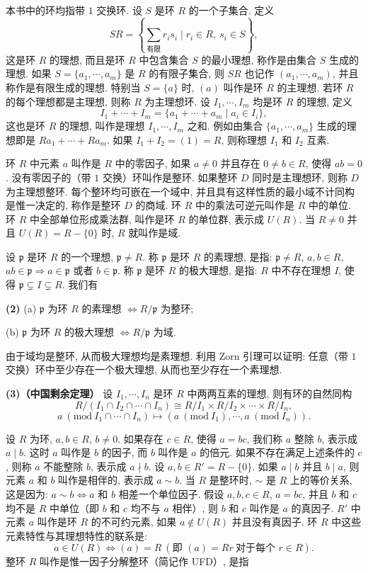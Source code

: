 本书中的环均指带 $1$ 交换环. 设 $S$ 是环 $R$ 的一个子集合. 定义
\[
  SR=\left\{\sum_{\text{有限}}r_is_i\mid r_i\in R,\ s_i\in S\right\},
\]
这是环 $R$ 的理想, 而且是环 $R$ 中包含集合 $S$ 的最小理想, 称作是由集合 $S$ 生成的理想. 如果 $S=\{a_1,\cdots,a_m\}$ 是 $R$ 的有限子集合, 则 $SR$ 也记作 $(a_1,\cdots,a_m)$, 并且称作是有限生成的理想. 特别当 $S=\{a\}$ 时, $(a)$ 叫作是环 $R$ 的主理想. 若环 $R$ 的每个理想都是主理想, 则称 $R$ 为主理想环. 设 $I_1,\cdots,I_m$ 均是环 $R$ 的理想, 定义
\[
  I_1+\cdots+I_m=\{a_1+\cdots+a_m\mid a_i\in I_i\},
\]
这也是环 $R$ 的理想, 叫作是理想 $I_1,\cdots,I_m$ 之和. 例如由集合 $\{a_1,\cdots,a_m\}$ 生成的理想即是 $Ra_1+\cdots+Ra_m$. 如果 $I_1+I_2=(1)=R$, 则称理想 $I_1$ 和 $I_2$ 互素.

环 $R$ 中元素 $a$ 叫作是 $R$ 中的零因子, 如果 $a\neq 0$ 并且存在 $0\neq b\in R$, 使得 $ab=0$. 没有零因子的（带 $1$ 交换）环叫作是整环. 如果整环 $D$ 同时是主理想环, 则称 $D$ 为主理想整环. 每个整环均可嵌在一个域中, 并且具有这样性质的最小域不计同构是惟一决定的, 称作是整环 $D$ 的商域. 环 $R$ 中的乘法可逆元叫作是 $R$ 中的单位. 环 $R$ 中全部单位形成乘法群, 叫作是环 $R$ 的单位群, 表示成 $U(R)$. 当 $R\neq 0$ 并且 $U(R)=R-\{0\}$ 时, $R$ 就叫作是域.

设 $\mathfrak{p}$ 是环 $R$ 的一个理想, $\mathfrak{p}\neq R$. 称 $\mathfrak{p}$ 是环 $R$ 的素理想, 是指: $\mathfrak{p}\neq R$, $a,b\in R$, $ab\in\mathfrak{p}\Rightarrow a\in\mathfrak{p}$ 或者 $b\in\mathfrak{p}$. 称 $\mathfrak{p}$ 是环 $R$ 的极大理想, 是指: $R$ 中不存在理想 $I$, 使得 $\mathfrak{p}\subsetneq I\subsetneq R$. 我们有

\textbf{(2)} (a) $\mathfrak{p}$ 为环 $R$ 的素理想 $\Leftrightarrow R/\mathfrak{p}$ 为整环;

(b) $\mathfrak{p}$ 为环 $R$ 的极大理想 $\Leftrightarrow R/\mathfrak{p}$ 为域.

由于域均是整环, 从而极大理想均是素理想. 利用 Zorn 引理可以证明: 任意（带 $1$ 交换）环中至少存在一个极大理想, 从而也至少存在一个素理想.

\textbf{(3)（中国剩余定理）} 设 $I_1,\cdots,I_n$ 是环 $R$ 中两两互素的理想, 则有环的自然同构
\[
  R/(I_1\cap I_2\cap\cdots\cap I_n)\cong R/I_1\times R/I_2\times\cdots\times R/I_n,
\]
\[
  a\ (\mathrm{mod}\ I_1\cap\cdots\cap I_n)\mapsto
  (a\ (\mathrm{mod}\ I_1),\cdots,a\ (\mathrm{mod}\ I_n)).
\]

设 $R$ 为环, $a,b\in R$, $b\neq 0$. 如果存在 $c\in R$, 使得 $a=bc$, 我们称 $a$ 整除 $b$, 表示成 $a\mid b$. 这时 $a$ 叫作是 $b$ 的因子, 而 $b$ 叫作是 $a$ 的倍元. 如果不存在满足上述条件的 $c$, 则称 $a$ 不能整除 $b$, 表示成 $a\nmid b$. 设 $a,b\in R'=R-\{0\}$. 如果 $a\mid b$ 并且 $b\mid a$, 则元素 $a$ 和 $b$ 叫作是相伴的, 表示成 $a\sim b$. 当 $R$ 是整环时, $\sim$ 是 $R$ 上的等价关系, 这是因为: $a\sim b\Leftrightarrow a$ 和 $b$ 相差一个单位因子. 假设 $a,b,c\in R$, $a=bc$, 并且 $b$ 和 $c$ 均不是 $R$ 中单位（即 $b$ 和 $c$ 均不与 $a$ 相伴）, 则 $b$ 和 $c$ 叫作是 $a$ 的真因子. $R'$ 中元素 $a$ 叫作是环 $R$ 的不可约元素, 如果 $a\notin U(R)$ 并且没有真因子. 环 $R$ 中这些元素特性与其理想特性的联系是:
\[
  a\in U(R)\Leftrightarrow(a)=R\ (\text{即 } (a)=Rr\ \text{对于每个 } r\in R).
\]
整环 $R$ 叫作是惟一因子分解整环（简记作 UFD）, 是指

